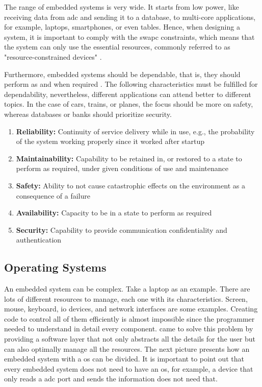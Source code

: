 The range of embedded systems is very wide. It starts from low power, like receiving data from \gls{adc} and sending it to a database, to multi-core applications, for example, laptops, smartphones, or even tables. Hence, when designing a system, it is important to comply with the \gls{swapc} constraints, which means that the system can only use the essential resources, commonly referred to as "resource-constrained devices" \cite{swapc}. 

Furthermore, embedded systems should be dependable, that is, they should perform as and when required \cite{iec}. The following characteristics must be fulfilled for dependability, nevertheless, different applications can attend better to different topics. In the case of cars, trains, or planes, the focus should be more on safety, whereas databases or banks should prioritize security.

\begin{enumerate}
    \item \textbf{Reliability:} Continuity of service delivery while in use, e.g., the probability of the system working properly since it worked after startup

    \item \textbf{Maintainability:} Capability to be retained in, or restored to a state to perform as required, under given conditions of use and maintenance

    \item \textbf{Safety:} Ability to not cause catastrophic effects on the environment as a consequence of a failure

    \item \textbf{Availability:} Capacity to be in a state to perform as required 
    
    \item \textbf{Security:} Capability to provide communication confidentiality and authentication
    
\end{enumerate}


\subsection{Operating Systems}

An embedded system can be complex. Take a laptop as an example. There are lots of different resources to manage, each one with its characteristics. Screen, mouse, keyboard, \gls{io} devices, and network interfaces are some examples. Creating code to control all of them efficiently is almost impossible since the programmer needed to understand in detail every component.  came to solve this problem by providing a software layer that not only abstracts all the details for the user but can also optimally manage all the resources. The next picture presents how an embedded system with a \gls{os} can be divided. It is important to point out that every embedded system does not need to have an \gls{os}, for example, a device that only reads a \gls{adc} port and sends the information does not need that. 

